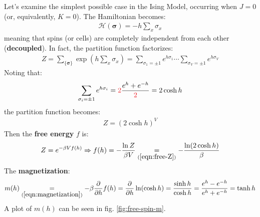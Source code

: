 \documentclass[../../main.tex]{subfiles}
\begin{document}
\begin{example}
    Let's examine the simplest possible case in the Ising Model, occurring when $J=0$ (or, equivalently, $K=0$). The Hamiltonian becomes:
    \begin{align}\label{eqn:free-H}
        \mathcal{H}(\bm{\sigma}) = -h \sum_x \sigma_x
    \end{align}
    meaning that spins (or cells) are completely independent from each other (\textbf{decoupled}). In fact, the partition function factorizes:
    \begin{align*}
        Z= \sum_{\{\bm{\sigma}\}} \exp({h \sum_x \sigma_x}) = \sum_{\sigma_1 = \pm 1} e^{h \sigma_1} \cdots \sum_{\sigma_V = \pm 1}e^{h \sigma_V}
    \end{align*}
    Noting that:
    \begin{align*}
        \sum_{\sigma_i = \pm 1} e^{h \sigma_i} = \textcolor{Red}{2} \frac{e^{h} + e^{-h}}{\textcolor{Red}{2}} = 2 \cosh h
    \end{align*}
    the partition function becomes:
    \begin{align} \label{eqn:free-Z}
        Z = (2 \cosh h)^V
    \end{align}
    Then the \textbf{free energy} $f$ is:
    \begin{align}\label{eqn:free-f}
        Z = e^{- \beta V f(h)} \Rightarrow f(h) = - \frac{\ln Z}{\beta V} \underset{(\ref{eqn:free-Z})}{=}  -\frac{\ln(2 \cosh h)}{\beta}
    \end{align}
    The \textbf{magnetization}:
    \begin{align}\label{eqn:mh}
        m(h) \underset{(\ref{eqn:magnetization})}{=}  -\beta \pdv{h}f(h) = \pdv{h} \ln(\cosh h) = \frac{\sinh h}{\cosh h} = \frac{e^h - e^{-h}}{e^{h} + e^{-h}} = \tanh h  
    \end{align}
    A plot of $m(h)$ can be seen in fig. \ref{fig:free-spin-m}. 


\end{example}
\end{document}
